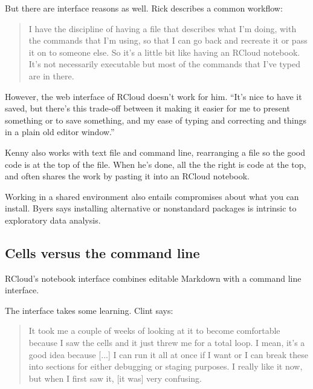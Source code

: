
But there are interface reasons as well. Rick describes a common workflow:
\begin{quote}
I have the discipline of having a file that describes what I'm doing, with the
commands that I'm using, so that I can go back and recreate it or pass it on to
someone else. So it's a little bit like having an RCloud notebook. It's not
necessarily executable but most of the commands that I've typed are in there.
\end{quote}

However, the web interface of RCloud doesn't work for him. ``It's nice to have
it saved, but there's this trade-off between it making it easier for me to
present something or to save something, and my ease of typing and
correcting and things in a plain old editor window.''

Kenny also works with text file and command line, rearranging a file so the
good code is at the top of the file. When he's done, all the the right is
code at the top, and often shares the work by pasting it into an RCloud
notebook.


Working in a shared environment also entails compromises about what you can
install. Byers says installing alternative or nonstandard packages is
intrinsic to exploratory data analysis.

\subsection{Cells versus the command line}
RCloud's notebook interface combines editable Markdown with a command line
interface.

The interface takes some learning. Clint says:
\begin{quote}
It took me a couple of weeks of
looking at it to become comfortable because I saw the cells and it just threw me
for a total loop. I mean, it's a good idea because [...] I can run it all at
once if I want or I can break these into sections for either debugging or
staging purposes. I really like it now, but when I first saw it, [it was] very
confusing.
\end{quote}

